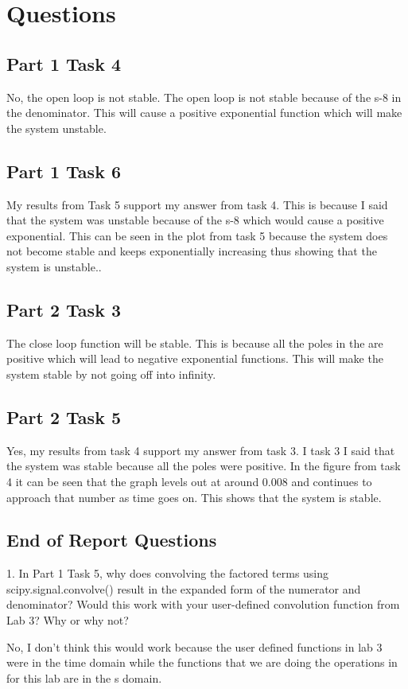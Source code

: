 \documentclass[11pt,a4]{report}
\begin{document}
\section{Questions}
\subsection{Part 1 Task 4}
No, the open loop is not stable. The open loop is not stable because of the s-8 in the denominator. This will cause a positive exponential function which will make the system unstable. 
\subsection{Part 1 Task 6}
My results from Task 5 support my answer from task 4. This is because I said that the system was unstable because of the s-8 which would cause a positive exponential. This can be seen in the plot from task 5 because the system does not become stable and keeps exponentially increasing thus showing that the system is unstable.. 
\subsection{Part 2 Task 3}
The close loop function will be stable. This is because all the poles in the are positive which will lead to negative exponential functions. This will make the system stable by not going off into infinity. 
\subsection{Part 2 Task 5}
Yes, my results from task 4 support my answer from task 3. I task 3 I said that the system was stable because all the poles were positive. In the figure from task 4 it can be seen that the graph levels out at around 0.008 and continues to approach that number as time goes on. This shows that the system is stable. 

\subsection{End of Report Questions}
1. In Part 1 Task 5, why does convolving the factored terms using scipy.signal.convolve()
result in the expanded form of the numerator and denominator? Would this work with your
user-defined convolution function from Lab 3? Why or why not?

No, I don't think this would work because the user defined functions in lab 3 were in the time domain while the functions that we are doing the operations in for this lab are in the s domain. 
\end{document}
